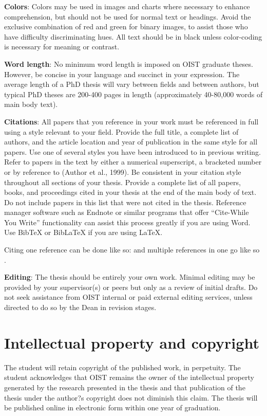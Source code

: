 \textbf{Colors}:  Colors may be used in images and charts where necessary to enhance comprehension, but should not be used for normal text or headings.  Avoid the exclusive combination of red and green for binary images, to assist those who have difficulty discriminating hues.  All text should be in black unless color-coding is necessary for meaning or contrast.

\textbf{Word length}:  No minimum word length is imposed on OIST graduate theses.  However, be concise in your language and succinct in your expression.  The average length of a PhD thesis will vary between fields and between authors, but typical PhD theses are 200-400 pages in length (approximately 40-80,000 words of main body text).

\textbf{Citations}:  All papers that you reference in your work must be referenced in full using a style relevant to your field. Provide the full title, a complete list of authors, and the article location and year of publication in the same style for all papers. Use one of several styles you have been introduced to in previous writing.  Refer to papers in the text by either a numerical superscript, a bracketed number or by reference to (Author et al., 1999).  Be consistent in your citation style throughout all sections of your thesis.  Provide a complete list of all papers, books, and proceedings cited in your thesis at the end of the main body of text.  Do not include papers in this list that were not cited in the thesis.  Reference manager software such as Endnote or similar programs that offer ``Cite-While You Write'' functionality can assist this process greatly if you are using Word. Use BibTeX or BibLaTeX if you are using LaTeX.

Citing one reference can be done like so: \cite{Lee98} and multiple references in one go like so \cite{Fil09, Muc10, Kra27}.

\textbf{Editing}:  The thesis should be entirely your own work. Minimal editing may be provided by your supervisor(s) or peers but only as a review of initial drafts.  Do not seek assistance from OIST internal or paid external editing services, unless directed to do so by the Dean in revision stages.

\section{Intellectual property and copyright}

The student will retain copyright of the published work, in perpetuity.  The student acknowledges that OIST remains the owner of the intellectual property generated by the research presented in the thesis and that publication of the thesis under the author?s copyright does not diminish this claim.  The thesis will be published online in electronic form within one year of graduation.


